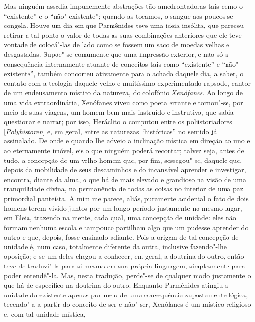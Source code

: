 \sectionitem

Mas ninguém assedia impunemente abstrações tão amedrontadoras tais como
o ``existente'' e o ``não"-existente''; quando as tocamos, o sangue aos
poucos se congela. Houve um dia em que Parmênides teve uma ideia
insólita, que pareceu retirar a tal ponto o valor de todas as suas
combinações anteriores que ele teve vontade de colocá"-las de lado
como se fossem um saco de moedas velhas e desgastadas. Supõe"-se comumente que uma
impressão exterior, e não só a consequência internamente atuante de
conceitos tais como ``existente'' e ``não"-existente'', também concorreu
ativamente para o achado daquele dia, a saber, o contato com a teologia 
daquele velho e muitíssimo experimentado rapsodo, cantor de um
endeusamento místico da natureza, do colofônio \textit{Xenófanes}. Ao
longo de uma vida extraordinária, Xenófanes viveu como poeta errante e
tornou"-se, por meio de suas viagens, um homem bem mais instruído e
instrutivo, que sabia questionar e narrar; por isso, Heráclito o
computou entre os poliistoriadores [\textit{Polyhistoren}] e, em
geral, entre as naturezas ``históricas'' no sentido já assinalado. De
onde e quando lhe adveio a inclinação mística em direção ao uno e ao
eternamente imóvel, eis o que ninguém poderá recontar; talvez seja,
antes de tudo, a concepção de um velho homem que, por fim, sossegou"-se, \label{velhohomem}
daquele que, depois da mobilidade de seus descaminhos e do incansável
aprender e investigar, encontra, diante da alma, o que há de mais
elevado e grandioso na visão de uma tranquilidade divina, na
permanência de todas as coisas no interior de uma paz
primordial panteísta. A mim me parece, aliás, puramente acidental o fato de dois
homens terem vivido juntos por um longo período justamente no mesmo
lugar, em Eleia, trazendo na mente, cada qual, uma concepção de
unidade: eles não formam nenhuma escola e tampouco partilham algo que
um pudesse aprender do outro e que, depois, fosse ensinado adiante.
Pois a origem de tal concepção de unidade é, num caso, totalmente
diferente da outra, inclusive fazendo"-lhe oposição; e se um deles
chegou a conhecer, em geral, a doutrina do outro, então teve de
traduzi"-la para si mesmo em sua própria linguagem, simplesmente para
poder entendê"-la. Mas, nesta tradução, perde"-se de qualquer modo
justamente o que há de específico na doutrina do outro. Enquanto
Parmênides atingiu a unidade do existente apenas por meio de uma
consequência supostamente lógica, tecendo"-a a partir do conceito de ser
e não"-ser, Xenófanes é um místico religioso e, com tal unidade mística,
